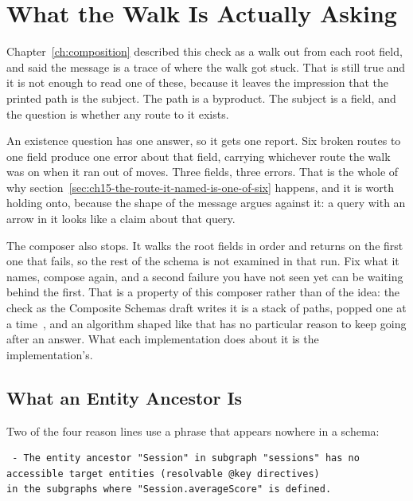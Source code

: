 \section{What the Walk Is Actually Asking}
\label{sec:ch15-what-the-walk-is-asking}

%
Chapter~\ref{ch:composition} described this check as a walk out from each root
field, and said the message is a trace of where the walk got stuck. That is
still true and it is not enough to read one of these, because it leaves the
impression that the printed path is the subject. The path is a byproduct. The
subject is a field, and the question is whether any route to it exists.

%
An existence question has one answer, so it gets one report. Six broken routes
to one field produce one error about that field, carrying whichever route the
walk was on when it ran out of moves. Three fields, three errors. That is the
whole of why
section~\ref{sec:ch15-the-route-it-named-is-one-of-six} happens, and it is
worth holding onto, because the shape of the message argues against it: a query
with an arrow in it looks like a claim about that query.

%
The composer also stops. It walks the root fields in order and returns on the
first one that fails, so the rest of the schema is not examined in that run.
Fix what it names, compose again, and a second failure you have not seen yet
can be waiting behind the first. That is a property of this composer rather
than of the idea: the check as the Composite Schemas draft writes it is a stack
of paths, popped one at a time~\autocite{compositeschemasspec}, and an
algorithm shaped like that has no particular reason to keep going after an
answer. What each implementation does about it is the implementation's.

\subsection{What an Entity Ancestor Is}

%
Two of the four reason lines use a phrase that appears nowhere in a schema:

\begin{verbatim}
 - The entity ancestor "Session" in subgraph "sessions" has no accessible target entities (resolvable @key directives)
in the subgraphs where "Session.averageScore" is defined.
\end{verbatim}

